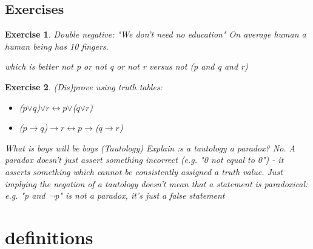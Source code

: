 \documentclass[10pt,a4paper,draft,titlepage,onecolumn]{book}
\newtheorem{exercise}{Exercise}[section]
\begin{document}
\section{Exercises}
\begin{exercise}
Double negative: "We don't need no education"
On average human a human being has 10 fingers.

which is better not p or not q or not r     versus  not (p and q and r)
\end{exercise}
\begin{exercise}
(Dis)prove using truth tables:
\begin{itemize}
\item ($p${$\vee$}$q$){$\vee$}$r${$\leftrightarrow$}$p${$\vee$}($q${$\vee$}$r$)
\item ($p${$\rightarrow$}$q$){$\rightarrow$}$r${$\leftrightarrow$}$p${$\rightarrow$}($q${$\rightarrow$}$r$)
\end{itemize}
What is boys will be boys (Tautology)
Explain :s a tautology a paradox? 
No. A paradox doesn't just assert something incorrect (e.g. "0 not equal to 0") - it asserts something which cannot be consistently assigned a truth value. Just implying the negation of a tautology doesn't mean that a statement is paradoxical: e.g. "p and ¬p" is not a paradox, it's just a false statement


\end{exercise}
\chapter{definitions}
\end{document}
